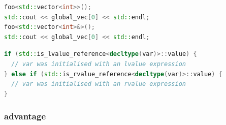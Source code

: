 \documentclass[a4paper,12pt,twoside]{book}
\begin{document}
\begin{itemize}
\begin{lstlisting}[frame=single, language=c++]
foo<std::vector<int>>();
std::cout << global_vec[0] << std::endl;
foo<std::vector<int>&>();
std::cout << global_vec[0] << std::endl;
\end{lstlisting}


\begin{lstlisting}[frame=single, language=c++]
if (std::is_lvalue_reference<decltype(var)>::value) {
  // var was initialised with an lvalue expression
} else if (std::is_rvalue_reference<decltype(var)>::value) {
  // var was initialised with an rvalue expression
}
\end{lstlisting}

\end{itemize}


\subsubsection{advantage}
\end{document}
